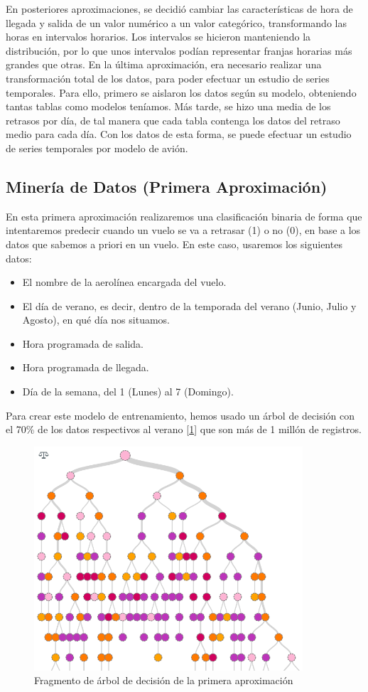 \documentclass[format=acmsmall, review=false, screen=true]{acmart}
\begin{document}
En posteriores aproximaciones, se decidió cambiar las características de hora de llegada y salida de un valor numérico a un valor categórico, transformando las horas en intervalos horarios. Los intervalos se hicieron manteniendo la distribución, por lo que unos intervalos podían representar franjas horarias más grandes que otras.
En la última aproximación, era necesario realizar una transformación total de los datos, para poder efectuar un estudio de series temporales. Para ello, primero se aislaron los datos según su modelo, obteniendo tantas tablas como modelos teníamos. Más tarde, se hizo una media de los retrasos por día, de tal manera que cada tabla contenga los datos del retraso medio para cada día. Con los datos de esta forma, se puede efectuar un estudio de series temporales por modelo de avión.
\subsection{Minería de Datos (Primera Aproximación)}
En esta primera aproximación realizaremos una clasificación binaria de forma que intentaremos predecir cuando un vuelo se va a retrasar (1) o no (0), en base a los datos que sabemos a priori en un vuelo. En este caso, usaremos los siguientes datos:
\begin{itemize}
	\item El nombre de la aerolínea encargada del vuelo.
	\item El día de verano, es decir, dentro de la temporada del verano (Junio, Julio y Agosto), en qué día nos situamos.
	\item Hora programada de salida.
	\item Hora programada de llegada.
	\item Día de la semana, del 1 (Lunes) al 7 (Domingo).
\end{itemize}
Para crear este modelo de entrenamiento, hemos usado un árbol de decisión con el 70\% de los datos respectivos al verano [\ref{fig:ArbAprox1}] que son más de 1 millón de registros.

\begin{figure}[htb]
	\centering
	\includegraphics[width=10cm]{ArbAprox1.png}
	\caption{Fragmento de árbol de decisión de la primera aproximación}
	\label{fig:ArbAprox1}
\end{figure}
\end{document}
